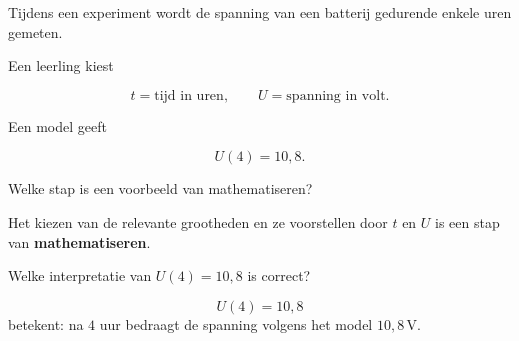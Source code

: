 \documentclass{ximera}
\begin{document}

\begin{oefening}{\oefB \ESS}

Tijdens een experiment wordt de spanning van een batterij gedurende
enkele uren gemeten.

Een leerling kiest

\[
t=\text{tijd in uren},
\qquad
U=\text{spanning in volt}.
\]

Een model geeft

\[
U(4)=10{,}8.
\]

\begin{question}
Welke stap is een voorbeeld van mathematiseren?

\begin{multipleChoice}
\end{multipleChoice}


\begin{oplossing}
Het kiezen van de relevante grootheden en ze voorstellen door $t$ en $U$
is een stap van \textbf{mathematiseren}.
\end{oplossing}

\end{question}

\begin{question}
Welke interpretatie van $U(4)=10{,}8$ is correct?

\begin{multipleChoice}
\end{multipleChoice}


\begin{oplossing}
\[
U(4)=10{,}8
\]
betekent: na $4$ uur bedraagt de spanning volgens het model
$10{,}8\,\mathrm V$.
\end{oplossing}

\end{question}

\end{oefening}
\end{document}

